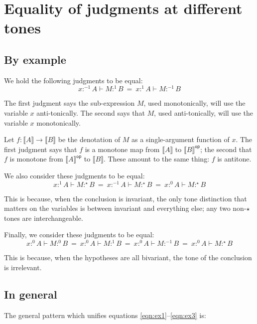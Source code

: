 \documentclass{article}
\newcommand{\ms}[1]{\ensuremath{\mathsf{#1}}}
\newcommand{\op}{\ms{op}}
\newcommand{\den}[1]{\llbracket{#1}\rrbracket}
\newcommand{\tm}{{\ensuremath{1}}}     %
\newcommand{\ta}{{\ensuremath{-1}}}    %
\newcommand{\ti}{{\ensuremath{\star}}} %
\newcommand{\tb}{{\ensuremath{0}}}     %
\newcommand{\h}[3]{#1 :^{#3}\! {#2}}
\newcommand{\hm}[2]{\h{#1}{#2}{\tm}}
\newcommand{\ha}[2]{\h{#1}{#2}{\ta}}
\newcommand{\hi}[2]{\h{#1}{#2}{\ti}}
\newcommand{\hb}[2]{\h{#1}{#2}{\tb}}
\begin{document}

\section{Equality of judgments at different tones}

\subsection{By example}

We hold the following judgments to be equal:
\begin{equation}\label{eqn:ex1}
 \ha{x}{A} \vdash \hm{M}{B} ~=~ \hm{x}{A} \vdash \ha{M}{B}
\end{equation}

The first judgment says the sub-expression $M$, used monotonically, will use the
variable $x$ anti-tonically. The second says that $M$, used anti-tonically, will
use the variable $x$ monotonically.

Let $f : \den{A} \to \den{B}$ be the denotation of $M$ as a single-argument
function of $x$. The first judgment says that $f$ is a monotone map from
$\den{A}$ to $\den{B}^{\op}$; the second that $f$ is monotone from
$\den{A}^{\op}$ to $\den{B}$. These amount to the same thing: $f$ is
antitone.

We also consider these judgments to be equal:
\begin{equation}
  \hm{x}{A} \vdash \hi{M}{B}
  ~=~
  \ha{x}{A} \vdash \hi{M}{B}
  ~=~
  \hb{x}{A} \vdash \hi{M}{B}
\end{equation}

This is because, when the conclusion is invariant, the only tone distinction
that matters on the variables is between invariant and everything else; any two
non-$\ti$ tones are interchangeable.

Finally, we consider these judgments to be equal:
\begin{equation} \label{eqn:ex3}
  \hb{x}{A} \vdash \hb{M}{B}
  ~=~
  \hb{x}{A} \vdash \hm{M}{B}
  ~=~
  \hb{x}{A} \vdash \ha{M}{B}
  ~=~
  \hb{x}{A} \vdash \hi{M}{B}
\end{equation}

This is because, when the hypotheses are all bivariant, the tone of the
conclusion is irrelevant.


\subsection{In general}
The general pattern which unifies equations \ref{eqn:ex1}--\ref{eqn:ex3} is:
\end{document}
